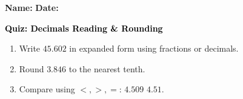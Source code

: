 \documentclass[12pt, letterpaper, fleqn]{article}
\newcommand{\blank}{\underline{\hspace{2.2cm}}}
\begin{document}
\textbf{Name:} \underline{\hspace{5cm}}
\hfill
\textbf{Date:} \underline{\hspace{3cm}}\\

\begin{tcolorbox}[colback=customteal!20]
    \large\textcolor{black}{\textbf{Quiz: Decimals Reading \& Rounding}}
\end{tcolorbox}
\begin{enumerate}[itemsep=3.5cm, leftmargin=0.6cm]
\item Write $45.602$ in expanded form using fractions or decimals.
\vspace{3.5cm}
\item Round $3.846$ to the nearest tenth.
\vspace{3.5cm}
\item Compare using $<, >, =$: $4.509$ \blank $4.51$.
\end{enumerate}
\end{document}

